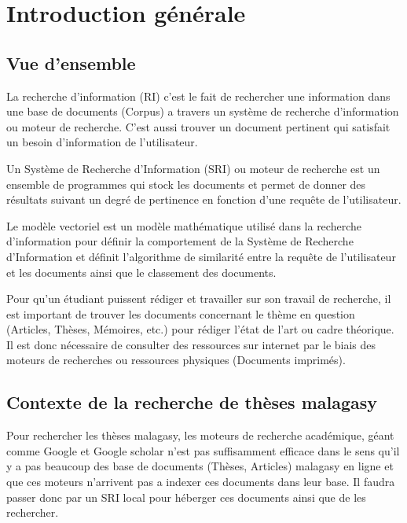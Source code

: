 \chapter*{Introduction générale}

\section*{Vue d'ensemble}
La recherche d'information (RI) c'est le fait de rechercher une information dans une base de documents (Corpus) a travers un système de recherche d'information ou moteur de recherche. C'est aussi trouver un document pertinent qui satisfait un besoin d'information de l'utilisateur.

Un Système de Recherche d'Information (SRI) ou moteur de recherche est un ensemble de programmes qui stock les documents et permet de donner des résultats suivant un degré de pertinence en fonction d'une requête de l'utilisateur.

Le modèle vectoriel est un modèle mathématique utilisé dans la recherche d'information pour définir la comportement de la Système de Recherche d'Information et définit l'algorithme de similarité entre la requête de l'utilisateur et les documents ainsi que le classement des documents.

Pour qu'un étudiant puissent rédiger et travailler sur son travail de recherche, il est important de trouver les documents concernant le thème en question (Articles, Thèses, Mémoires, etc.) pour rédiger l'état de l'art ou cadre théorique. Il est donc nécessaire de consulter des ressources sur internet par le biais des moteurs de recherches ou ressources physiques (Documents imprimés).

\section*{Contexte de la recherche de thèses malagasy}
Pour rechercher les thèses malagasy, les moteurs de recherche académique, géant comme Google et Google scholar n'est pas suffisamment efficace dans le sens qu'il y a pas beaucoup des base de documents (Thèses, Articles) malagasy en ligne et que ces moteurs n'arrivent pas a indexer ces documents dans leur base. Il faudra passer donc par un SRI local pour héberger ces documents ainsi que de les rechercher.

